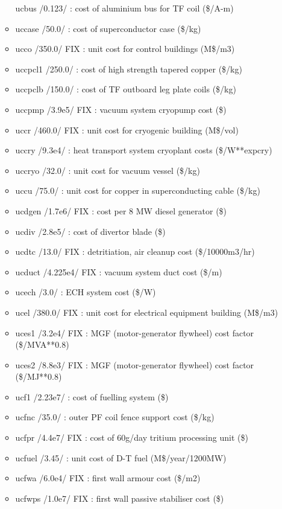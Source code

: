 \documentclass[]{article}
\begin{document}
\begin{itemize}
\begin{itemize}
    ucbus /0.123/ : cost of aluminium bus for TF coil (\$/A-m)
  \item
    uccase /50.0/ : cost of superconductor case (\$/kg)
  \item
    ucco /350.0/ FIX : unit cost for control buildings (M\$/m3)
  \item
    uccpcl1 /250.0/ : cost of high strength tapered copper (\$/kg)
  \item
    uccpclb /150.0/ : cost of TF outboard leg plate coils (\$/kg)
  \item
    uccpmp /3.9e5/ FIX : vacuum system cryopump cost (\$)
  \item
    uccr /460.0/ FIX : unit cost for cryogenic building (M\$/vol)
  \item
    uccry /9.3e4/ : heat transport system cryoplant costs (\$/W**expcry)
  \item
    uccryo /32.0/ : unit cost for vacuum vessel (\$/kg)
  \item
    uccu /75.0/ : unit cost for copper in superconducting cable (\$/kg)
  \item
    ucdgen /1.7e6/ FIX : cost per 8 MW diesel generator (\$)
  \item
    ucdiv /2.8e5/ : cost of divertor blade (\$)
  \item
    ucdtc /13.0/ FIX : detritiation, air cleanup cost (\$/10000m3/hr)
  \item
    ucduct /4.225e4/ FIX : vacuum system duct cost (\$/m)
  \item
    ucech /3.0/ : ECH system cost (\$/W)
  \item
    ucel /380.0/ FIX : unit cost for electrical equipment building
    (M\$/m3)
  \item
    uces1 /3.2e4/ FIX : MGF (motor-generator flywheel) cost factor
    (\$/MVA**0.8)
  \item
    uces2 /8.8e3/ FIX : MGF (motor-generator flywheel) cost factor
    (\$/MJ**0.8)
  \item
    ucf1 /2.23e7/ : cost of fuelling system (\$)
  \item
    ucfnc /35.0/ : outer PF coil fence support cost (\$/kg)
  \item
    ucfpr /4.4e7/ FIX : cost of 60g/day tritium processing unit (\$)
  \item
    ucfuel /3.45/ : unit cost of D-T fuel (M\$/year/1200MW)
  \item
    ucfwa /6.0e4/ FIX : first wall armour cost (\$/m2)
  \item
    ucfwps /1.0e7/ FIX : first wall passive stabiliser cost (\$)

\end{itemize}
\end{itemize}
\end{document}
